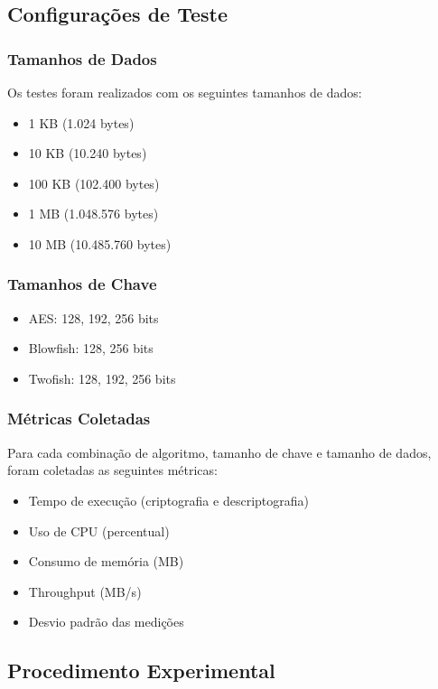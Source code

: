 \documentclass[12pt,a4paper,oneside]{article}
\begin{document}
\subsection{Configurações de Teste}

\subsubsection{Tamanhos de Dados}

Os testes foram realizados com os seguintes tamanhos de dados:
\begin{itemize}
    \item 1 KB (1.024 bytes)
    \item 10 KB (10.240 bytes)
    \item 100 KB (102.400 bytes)
    \item 1 MB (1.048.576 bytes)
    \item 10 MB (10.485.760 bytes)
\end{itemize}

\subsubsection{Tamanhos de Chave}

\begin{itemize}
    \item AES: 128, 192, 256 bits
    \item Blowfish: 128, 256 bits
    \item Twofish: 128, 192, 256 bits
\end{itemize}

\subsubsection{Métricas Coletadas}

Para cada combinação de algoritmo, tamanho de chave e tamanho de dados, foram coletadas as seguintes métricas:

\begin{itemize}
    \item Tempo de execução (criptografia e descriptografia)
    \item Uso de CPU (percentual)
    \item Consumo de memória (MB)
    \item Throughput (MB/s)
    \item Desvio padrão das medições
\end{itemize}

\subsection{Procedimento Experimental}
\end{document}
